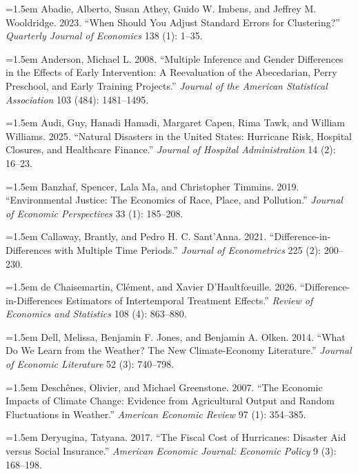 \begingroup
\setlength{\parindent}{0pt}
\setlength{\parskip}{0.55em}
\newcommand{\refitem}[1]{\hangindent=1.5em #1\par}

\refitem{Abadie, Alberto, Susan Athey, Guido W. Imbens, and Jeffrey M. Wooldridge. 2023. ``When Should You Adjust Standard Errors for Clustering?'' \textit{Quarterly Journal of Economics} 138 (1): 1--35.}

\refitem{Anderson, Michael L. 2008. ``Multiple Inference and Gender Differences in the Effects of Early Intervention: A Reevaluation of the Abecedarian, Perry Preschool, and Early Training Projects.'' \textit{Journal of the American Statistical Association} 103 (484): 1481--1495.}

\refitem{Audi, Guy, Hanadi Hamadi, Margaret Capen, Rima Tawk, and William Williams. 2025. ``Natural Disasters in the United States: Hurricane Risk, Hospital Closures, and Healthcare Finance.'' \textit{Journal of Hospital Administration} 14 (2): 16--23.}

\refitem{Banzhaf, Spencer, Lala Ma, and Christopher Timmins. 2019. ``Environmental Justice: The Economics of Race, Place, and Pollution.'' \textit{Journal of Economic Perspectives} 33 (1): 185--208.}

\refitem{Callaway, Brantly, and Pedro H. C. Sant'Anna. 2021. ``Difference-in-Differences with Multiple Time Periods.'' \textit{Journal of Econometrics} 225 (2): 200--230.}

\refitem{de Chaisemartin, Cl\'ement, and Xavier D'Haultf\oe uille. 2026. ``Difference-in-Differences Estimators of Intertemporal Treatment Effects.'' \textit{Review of Economics and Statistics} 108 (4): 863--880.}

\refitem{Dell, Melissa, Benjamin F. Jones, and Benjamin A. Olken. 2014. ``What Do We Learn from the Weather? The New Climate-Economy Literature.'' \textit{Journal of Economic Literature} 52 (3): 740--798.}

\refitem{Desch\^enes, Olivier, and Michael Greenstone. 2007. ``The Economic Impacts of Climate Change: Evidence from Agricultural Output and Random Fluctuations in Weather.'' \textit{American Economic Review} 97 (1): 354--385.}

\refitem{Deryugina, Tatyana. 2017. ``The Fiscal Cost of Hurricanes: Disaster Aid versus Social Insurance.'' \textit{American Economic Journal: Economic Policy} 9 (3): 168--198.}

